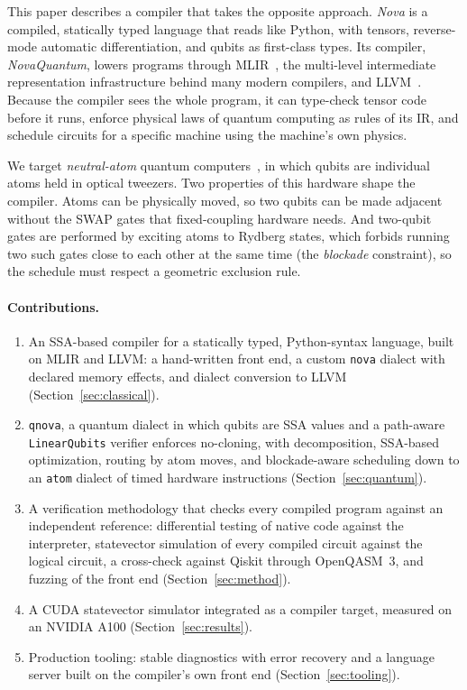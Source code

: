 \documentclass[11pt]{article}
\begin{document}
This paper describes a compiler that takes the opposite approach. \emph{Nova} is a compiled, statically typed
language that reads like Python, with tensors, reverse-mode automatic differentiation, and qubits as first-class
types. Its compiler, \emph{NovaQuantum}, lowers programs through MLIR~\cite{mlir}, the multi-level intermediate
representation infrastructure behind many modern compilers, and LLVM~\cite{llvm}. Because the compiler sees the
whole program, it can type-check tensor code before it runs, enforce physical laws of quantum computing as rules of
its IR, and schedule circuits for a specific machine using the machine's own physics.

We target \emph{neutral-atom} quantum computers~\cite{saffman2010,bluvstein2022}, in which qubits are individual
atoms held in optical tweezers. Two properties of this hardware shape the compiler. Atoms can be physically moved,
so two qubits can be made adjacent without the SWAP gates that fixed-coupling hardware needs. And two-qubit gates are
performed by exciting atoms to Rydberg states, which forbids running two such gates close to each other at the same
time (the \emph{blockade} constraint), so the schedule must respect a geometric exclusion rule.

\paragraph{Contributions.}
\begin{enumerate}
  \item An SSA-based compiler for a statically typed, Python-syntax language, built on MLIR and LLVM: a hand-written
        front end, a custom \texttt{nova} dialect with declared memory effects, and dialect conversion to LLVM
        (Section~\ref{sec:classical}).
  \item \texttt{qnova}, a quantum dialect in which qubits are SSA values and a path-aware \texttt{LinearQubits}
        verifier enforces no-cloning, with decomposition, SSA-based optimization, routing by atom moves, and
        blockade-aware scheduling down to an \texttt{atom} dialect of timed hardware instructions
        (Section~\ref{sec:quantum}).
  \item A verification methodology that checks every compiled program against an independent reference:
        differential testing of native code against the interpreter, statevector simulation of every compiled
        circuit against the logical circuit, a cross-check against Qiskit through OpenQASM~3, and fuzzing of the
        front end (Section~\ref{sec:method}).
  \item A CUDA statevector simulator integrated as a compiler target, measured on an NVIDIA A100
        (Section~\ref{sec:results}).
  \item Production tooling: stable diagnostics with error recovery and a language server built on the compiler's
        own front end (Section~\ref{sec:tooling}).
\end{enumerate}
\end{document}
